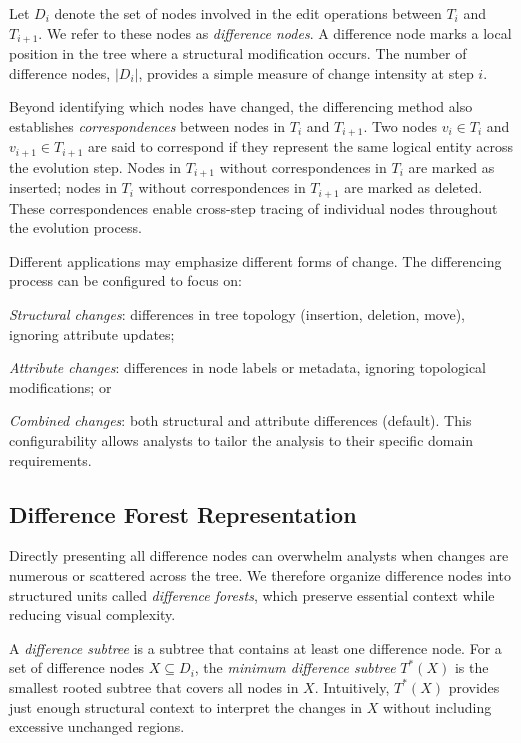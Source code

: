 Let $D_i$ denote the set of nodes involved in the edit operations between $T_i$ and $T_{i+1}$. We refer to these nodes as \emph{difference nodes}. A difference node marks a local position in the tree where a structural modification occurs. The number of difference nodes, $|D_i|$, provides a simple measure of change intensity at step $i$.

Beyond identifying which nodes have changed, the differencing method also establishes \emph{correspondences} between nodes in $T_i$ and $T_{i+1}$. Two nodes $v_i \in T_i$ and $v_{i+1} \in T_{i+1}$ are said to correspond if they represent the same logical entity across the evolution step. Nodes in $T_{i+1}$ without correspondences in $T_i$ are marked as inserted; nodes in $T_i$ without correspondences in $T_{i+1}$ are marked as deleted. These correspondences enable cross-step tracing of individual nodes throughout the evolution process.

Different applications may emphasize different forms of change. The differencing process can be configured to focus on:
\squishlist
	\item \emph{Structural changes}: differences in tree topology (insertion, deletion, move), ignoring attribute updates;
	\item \emph{Attribute changes}: differences in node labels or metadata, ignoring topological modifications; or
	\item \emph{Combined changes}: both structural and attribute differences (default).
\squishend
This configurability allows analysts to tailor the analysis to their specific domain requirements.

\subsection{Difference Forest Representation}
\label{sec:difference_forest}

Directly presenting all difference nodes can overwhelm analysts when changes are numerous or scattered across the tree. We therefore organize difference nodes into structured units called \emph{difference forests}, which preserve essential context while reducing visual complexity.

A \emph{difference subtree} is a subtree that contains at least one difference node. For a set of difference nodes $X \subseteq D_i$, the \emph{minimum difference subtree} $T^*(X)$ is the smallest rooted subtree that covers all nodes in $X$. Intuitively, $T^*(X)$ provides just enough structural context to interpret the changes in $X$ without including excessive unchanged regions.

